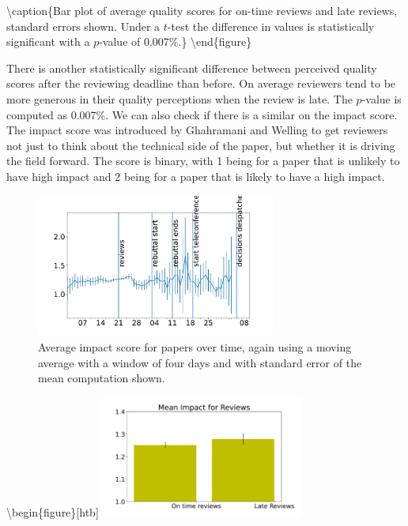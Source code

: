 \textbackslash caption\{Bar plot of average quality scores for on-time
reviews and late reviews, standard errors shown. Under a \(t\)-test the
difference in values is statistically significant with a \(p\)-value of
0.007\%.\} \label{review-quality-early-late}
\textbackslash end\{figure\}

There is another statistically significant difference between perceived
quality scores after the reviewing deadline than before. On average
reviewers tend to be more generous in their quality perceptions when the
review is late. The \(p\)-value is computed as 0.007\%. We can also
check if there is a similar on the impact score. The impact score was
introduced by Ghahramani and Welling to get reviewers not just to think
about the technical side of the paper, but whether it is driving the
field forward. The score is binary, with 1 being for a paper that is
unlikely to have high impact and 2 being for a paper that is likely to
have a high impact.

\begin{figure}[htb]
\includegraphics[width=0.70\textwidth]{diagrams/neurips/review-impact-time.pdf}


\caption{Average impact score for papers over time, again using a moving average with a window of four days and with standard error of the mean computation shown.}
\label{review-impact-time}
\end{figure}

\textbackslash begin\{figure\}{[}htb{]}
\includegraphics[width=0.50\textwidth]{diagrams/neurips/review-impact-early-late.pdf}

